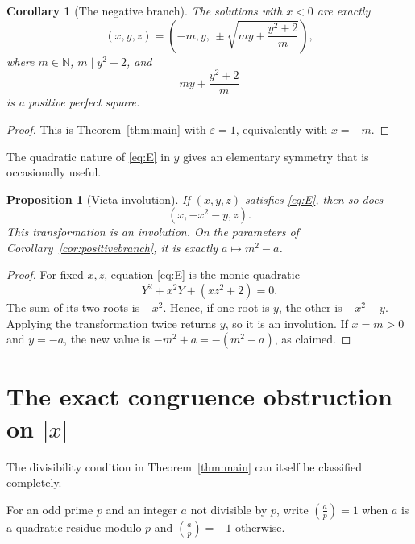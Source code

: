 \documentclass[11pt,a4paper]{amsart}
\numberwithin{equation}{section}
\newtheorem{proposition}[theorem]{Proposition}
\newtheorem{corollary}[theorem]{Corollary}
\theoremstyle{definition}
\newcommand{\N}{\mathbb N}
\begin{document}
\begin{corollary}[The negative branch]\label{cor:negativebranch}
The solutions with \(x<0\) are exactly
\begin{equation}
 (x,y,z)=
 \left(-m,y,\,\pm\sqrt{my+\frac{y^2+2}{m}}\right),
 \label{eq:negativeparam}
\end{equation}
where \(m\in\N\), \(m\mid y^2+2\), and
\begin{equation}
 my+\frac{y^2+2}{m}
 \label{eq:negativeSquare}
\end{equation}
is a positive perfect square.
\end{corollary}

\begin{proof}
This is Theorem~\ref{thm:main} with \(\varepsilon=1\), equivalently
with \(x=-m\).
\end{proof}

The quadratic nature of \eqref{eq:E} in \(y\) gives an elementary
symmetry that is occasionally useful.

\begin{proposition}[Vieta involution]\label{prop:vieta}
If \((x,y,z)\) satisfies \eqref{eq:E}, then so does
\begin{equation}
 (x,-x^2-y,z).
 \label{eq:vieta}
\end{equation}
This transformation is an involution.  On the parameters of
Corollary~\ref{cor:positivebranch}, it is exactly
\(a\mapsto m^2-a\).
\end{proposition}

\begin{proof}
For fixed \(x,z\), equation \eqref{eq:E} is the monic quadratic
\begin{equation*}
 Y^2+x^2Y+(xz^2+2)=0.
\end{equation*}
The sum of its two roots is \(-x^2\).  Hence, if one root is \(y\), the
other is \(-x^2-y\).  Applying the transformation twice returns \(y\),
so it is an involution.  If \(x=m>0\) and \(y=-a\), the new value is
\(-m^2+a=-(m^2-a)\), as claimed.
\end{proof}

\section{The exact congruence obstruction on \texorpdfstring{$|x|$}{|x|}}

The divisibility condition in Theorem~\ref{thm:main} can itself be
classified completely.


For an odd prime $p$ and an integer $a$ not divisible by $p$, write
$\left(\frac ap\right)=1$ when $a$ is a quadratic residue modulo $p$
and $\left(\frac ap\right)=-1$ otherwise.
\end{document}
